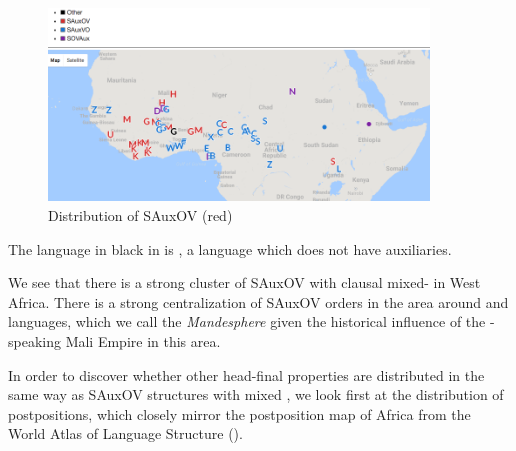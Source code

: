 \documentclass[output=paper]{LSP/langsci}
\begin{document}
{
  \begin{figure}
    \centering
    \includegraphics[width =0.9\textwidth]{figures/SAOV.png}
    \caption{Distribution of SAuxOV (red)} \label{fig:sande:sauxov}
  \end{figure}
}

The language in black in  is , a  language which does not have auxiliaries.

We see that there is a strong cluster of SAuxOV with clausal mixed- in West Africa. There is a strong centralization of SAuxOV orders in the area around  and  languages, which we call the \textit{Mandesphere} given the historical influence of the -speaking Mali Empire in this area.


In order to discover whether other head-final properties are distributed in the same way as SAuxOV structures with mixed , we look first at the distribution of postpositions, which closely mirror the postposition map of Africa from the World Atlas of Language Structure \citep{wals-85} ().
\end{document}
